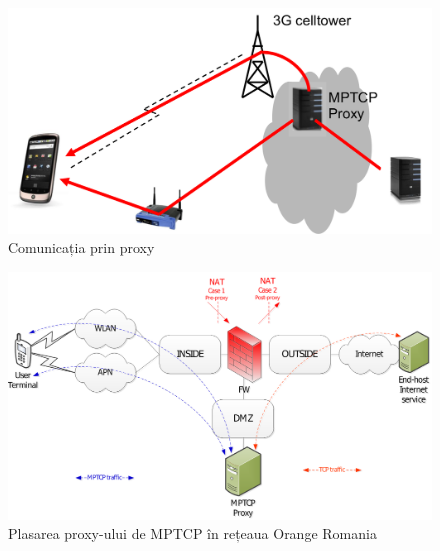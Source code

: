 \begin{figure}[h]
	\centering
	\includegraphics[scale=0.7]{figures/45g_proxy.png}
	\caption{Comunicația prin proxy}
\end{figure}



\begin{figure}[h]
        \centering
        \includegraphics[scale=0.3]{figures/oro/oro_mptcp.png}
        \caption{Plasarea proxy-ului de MPTCP în rețeaua Orange Romania}
\end{figure}


 
